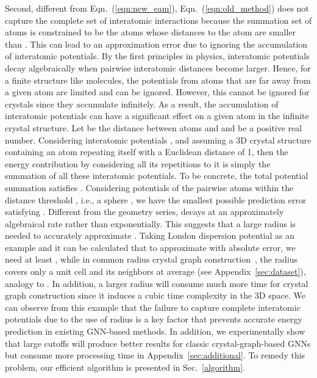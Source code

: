 \documentclass[nohyperref]{article}
\theoremstyle{plain}
\theoremstyle{definition}
\theoremstyle{remark}
\begin{document}
Second, different from Eqn.~(\ref{eqn:new_eam}), Eqn.~(\ref{eqn:old_method}) does not capture the complete set of interatomic interactions because the summation set  of atoms  is constrained to be the atoms whose distances to the atom  are smaller than . This can lead to an approximation error due to ignoring the accumulation of interatomic potentials. By the first principles in physics, interatomic potentials decay algebraically when pairwise interatomic distances become larger. Hence, for a finite structure like molecules, the potentials from atoms that are far away from a given atom are limited and can be ignored. However, this cannot be ignored for crystals since they accumulate infinitely. As a result, the accumulation of interatomic potentials can have a significant effect on a given atom in the infinite crystal structure. Let  be the distance between atoms  and  and  be a positive real number. Considering interatomic potentials , and assuming a 3D crystal structure containing an atom repeating itself with a Euclidean distance of 1, then the energy contribution by considering all its repetitions to it is simply the summation of all these interatomic potentials. To be concrete, the total potential summation  satisfies . Considering potentials of the pairwise atoms within the distance threshold , i.e., a sphere , we have the smallest possible prediction error  satisfying . Different from the geometry series,  decays at an approximately algebraical rate rather than exponentially. This suggests that a large radius  is needed to accurately approximate . Taking London dispersion potential  as an example and it can be calculated that to approximate  with  absolute error, we need at least , while in common radius crystal graph construction~\citep{xie2018crystal,MegNet,ALIGNN,GATGNN,schutt2017schnet}, the radius covers only a unit cell and its neighbors at average (see Appendix~\ref{sec:dataset}), analogy to . In addition, a larger radius will consume much more time for crystal graph construction since it induces a cubic time complexity in the 3D space.
We can observe from this example that the failure to capture complete interatomic potentials due to the use of radius is a key factor that prevents accurate energy prediction in existing GNN-based methods. In addition, we experimentally show that large cutoffs will produce better results for classic crystal-graph-based GNNs but consume more processing time in Appendix~\ref{sec:additional}. To remedy this problem, our efficient algorithm is presented in Sec.~\ref{algorithm}.
\end{document}
